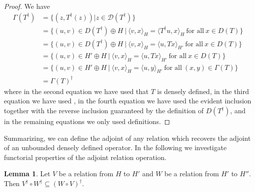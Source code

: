 \documentclass{article}
\newcommand{\D}{\mathcal{D}}
\numberwithin{equation}{section}
\theoremstyle{definition}
\newtheorem{lemma}[definition]{Lemma}
\theoremstyle{theorem}
\begin{document}
\begin{proof}
    We have 
    \begin{align*}
        \Gamma(T^\dagger) &= \{(z,T^\dagger(z)) | z \in \D(T^\dagger)\} \\
        &= \{(u,v) \in D(T^\dagger) \oplus H \ | \ \langle v,x \rangle_{H} = \langle T^\dagger u,x \rangle_{H} \ \text{for all} \ x \in D(T) \} \\ 
        &= \{(u,v) \in D(T^\dagger) \oplus H \ | \ \langle v,x \rangle_{H} = \langle u, Tx \rangle_{H'} \ \text{for all} \ x \in D(T) \} \\
        &= \{(u,v) \in H' \oplus H \ | \ \langle v,x \rangle_{H} = \langle u,Tx \rangle_{H'} \ \text{for all} \ x \in D(T) \} \\
        &= \{(u,v) \in H' \oplus H \ | \ \langle v,x \rangle_{H} = \langle u,y \rangle_{H'} \ \text{for all} \ (x,y) \in \Gamma(T)\} \\
        &= \Gamma(T)^\dagger
    \end{align*}
    where in the second equation we have used that $T$ is densely defined, in the third equation we have used 
    , in the fourth equation we have used the evident inclusion together with the reverse inclusion 
    guaranteed by the definition of $D(T^\dagger)$, and in the remaining equations we only used definitions.
\end{proof}
Summarizing, we can define the adjoint of any relation which recovers the adjoint of an unbounded densely defined operator. In the following we investigate 
functorial properties of the adjoint relation operation.
\begin{lemma}\label{Lemma: relations and adjoints}
    Let $V$ be a relation from $H$ to $H'$ and $W$ be a relation from $H'$ to $H''$. Then $V^\dagger \circ W^\dagger  \subseteq (W \circ V)^{\dagger}$.
\end{lemma}
\end{document}
